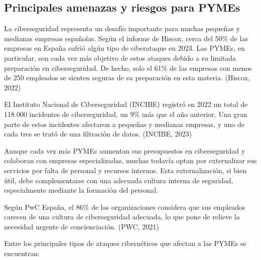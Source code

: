\documentclass[a4paper, 10pt]{article}
\begin{document}
\subsection{Principales amenazas y riesgos para PYMEs}

La ciberseguridad representa un desafío importante para muchas pequeñas y medianas empresas españolas. Según el informe de Hiscox, cerca del 50\% de las empresas en España sufrió algún tipo de ciberataque en 2023. Las PYMEs, en particular, son cada vez más objetivo de estos ataques debido a su limitada preparación en ciberseguridad. De hecho, solo el 61\% de las empresas con menos de 250 empleados se sienten seguras de su preparación en esta materia. (Hiscox, 2022) \cite{hiscox}
\par\vspace{0.5cm}

El Instituto Nacional de Ciberseguridad (INCIBE) registró en 2022 un total de 118.000 incidentes de ciberseguridad, un 9\% más que el año anterior. Una gran parte de estos incidentes afectaron a pequeñas y medianas empresas, y uno de cada tres se trató de una filtración de datos. (INCIBE, 2023) \cite{incibe2023}
\par\vspace{0.5cm}

Aunque cada vez más PYMEs aumentan sus presupuestos en ciberseguridad y colaboran con empresas especializadas, muchas todavía optan por externalizar sus servicios por falta de personal y recursos internos. Esta externalización, si bien útil, debe complementarse con una adecuada cultura interna de seguridad, especialmente mediante la formación del personal.
\par\vspace{0.5cm}

Según PwC España, el 86\% de las organizaciones considera que sus empleados carecen de una cultura de ciberseguridad adecuada, lo que pone de relieve la necesidad urgente de concienciación. (PWC, 2021) \cite{pow}

\vspace{0.5cm}
Entre los principales tipos de ataques cibernéticos que afectan a las PYMEs se encuentran:
\end{document}

